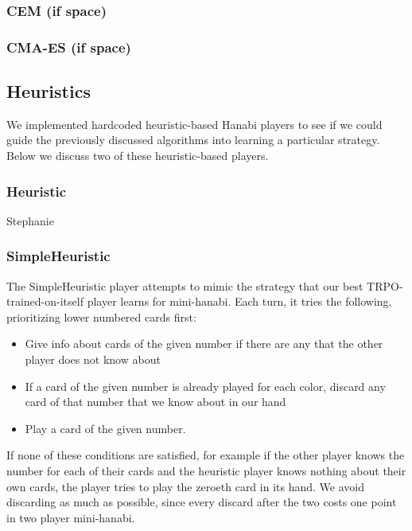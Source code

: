 \subsubsection{CEM (if space)}
\subsubsection{CMA-ES (if space)}

\subsection{Heuristics}

We implemented hardcoded heuristic-based Hanabi players to see if we could
guide the previously discussed algorithms into learning a particular strategy.
Below we discuss two of these heuristic-based players.

\subsubsection{Heuristic}

Stephanie

\subsubsection{SimpleHeuristic}

The SimpleHeuristic player attempts to mimic the strategy that our best
TRPO-trained-on-itself player learns for mini-hanabi. Each turn, it tries the
following, prioritizing lower numbered cards first:

\begin{itemize}
\item Give info about cards of the given number if there are any that the other player does not know about
\item If a card of the given number is already played for each color, discard any card of that number that we know about in our hand
\item Play a card of the given number.
\end{itemize}

If none of these conditions are satisfied, for example if the other player
knows the number for each of their cards and the heuristic player knows
nothing about their own cards, the player tries to play the zeroeth card in
its hand. We avoid discarding as much as possible, since every discard after
the two costs one point in two player mini-hanabi.

